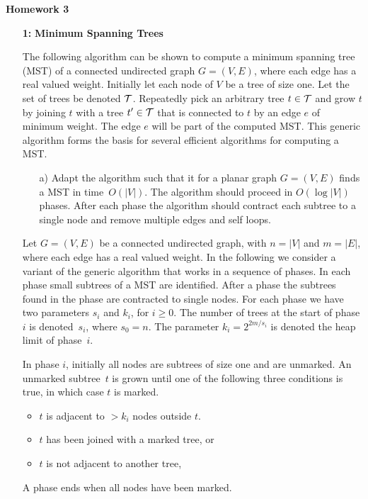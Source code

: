 \documentclass[11pt]{article}
\begin{document}
\begin{center}
  \bf {\large Homework 3}
\end{center}

\begin{itemize}

\item[\bf 1:] {\bf Minimum Spanning Trees}
  
  The following algorithm can be shown to compute a minimum spanning
  tree (MST) of a connected undirected graph $G=(V,E)$, where each
  edge has a real valued weight.  Initially let each node of $V$ be a
  tree of size one.  Let the set of trees be denoted $\cal{T}$.
  Repeatedly pick an arbitrary tree $t\in \cal{T}$ and grow $t$ by
  joining $t$ with a tree $t'\in \cal{T}$ that is connected to $t$ by
  an edge $e$ of minimum weight. The edge $e$ will be part of the
  computed MST. This generic algorithm forms the basis for several
  efficient algorithms for computing a MST.

  \begin{itemize} 
  \item[a)] Adapt the algorithm such that it for a planar graph $G=(V,E)$ finds a
    MST in time~$O(|V|)$. The algorithm should proceed in $O(\log
    |V|)$ phases.  After each phase the algorithm should contract each
    subtree to a single node and remove multiple edges and self loops.
  \end{itemize}
  
  Let $G=(V,E)$ be a connected undirected graph, with $n=|V|$ and
  $m=|E|$, where each edge has  a real valued weight. In the
  following we consider a variant of the generic algorithm that works
  in a sequence of phases. In each phase small subtrees of a MST are
  identified. After a phase the subtrees found in the phase are
  contracted to single nodes.  For each phase we have two parameters $s_i$
  and $k_i$, for $i\geq 0$. The number of trees at the start of
  phase $i$ is denoted~$s_i$, where $s_0=n$. The parameter
  $k_i=2^{2m/s_i}$ is denoted the heap limit of phase~$i$.
  
  In phase $i$, initially all nodes are subtrees of size one and are
  unmarked. An unmarked subtree~$t$ is grown until one of the
  following three conditions is true, in which case $t$ is marked.
  \begin{itemize}
  \item $t$ is adjacent to $>k_i$ nodes outside $t$.
  \item $t$ has been joined with a marked tree, or
  \item $t$ is not adjacent to another tree,
  \end{itemize}
  A phase ends when all nodes have been marked.


\end{itemize}
\end{document}
